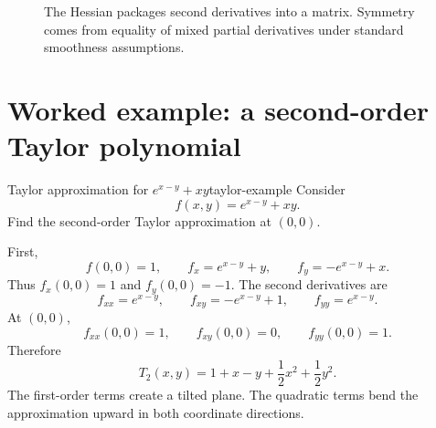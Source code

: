 \documentclass[11pt]{article}
\newcommand{\T}{^{\mathsf T}}
\begin{document}
\begin{figure}[H]
\centering
{}
\caption{The Hessian packages second derivatives into a matrix. Symmetry comes from equality of mixed partial derivatives under standard smoothness assumptions.}
\end{figure}

\section{Worked example: a second-order Taylor polynomial}

\begin{examplebox}{Taylor approximation for $e^{x-y}+xy$}{taylor-example}
Consider
\[
f(x,y)=e^{x-y}+xy.
\]
Find the second-order Taylor approximation at $(0,0)$.

First,
\[
f(0,0)=1,
\qquad
f_x=e^{x-y}+y,
\qquad
f_y=-e^{x-y}+x.
\]
Thus $f_x(0,0)=1$ and $f_y(0,0)=-1$. The second derivatives are
\[
f_{xx}=e^{x-y},\qquad f_{xy}=-e^{x-y}+1,\qquad f_{yy}=e^{x-y}.
\]
At $(0,0)$,
\[
f_{xx}(0,0)=1,\qquad f_{xy}(0,0)=0,\qquad f_{yy}(0,0)=1.
\]
Therefore
\[
T_2(x,y)=1+x-y+\frac12x^2+\frac12y^2.
\]
The first-order terms create a tilted plane. The quadratic terms bend the approximation upward in both coordinate directions.
\end{examplebox}
\end{document}
